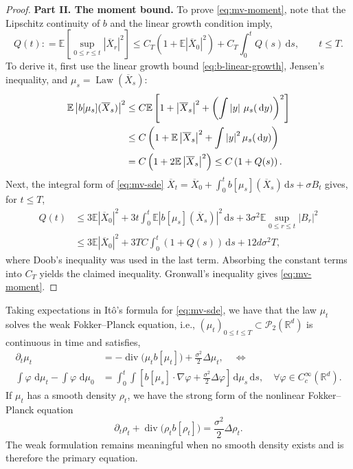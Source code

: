 \documentclass[11pt]{amsart}
\numberwithin{equation}{section}
\theoremstyle{plain}
\newcommand{\R}{\mathbb{R}}
\newcommand{\E}{\mathbb{E}}
\newcommand{\cP}{\mathcal{P}}
\newcommand{\dd}{\,\mathrm{d}}
\newcommand{\abs}[1]{\left\lvert#1\right\rvert}
\DeclareMathOperator{\Law}{Law}
\DeclareMathOperator{\diver}{div}
\begin{document}
\begin{proof}
\textbf{Part II. The moment bound.}
To prove \eqref{eq:mv-moment}, note that the Lipschitz continuity of $b$ and the linear growth condition imply, 
\[
 Q(t): =\E[\sup_{0\leq r\leq t}\abs{\overline X_r}^2] \leq C_T\left(1+\E\abs{\overline X_0}^2\right)
       +C_T\int_0^tQ(s)\dd s,\qquad t\leq T.
\]
To derive it, first use the linear growth bound \eqref{eq:b-linear-growth}, Jensen's inequality, and
$\mu_s=\Law(\overline X_s)$:
\begin{align}
 \E\abs{b[\mu_s](\overline X_s)}^2
 &\leq C\E\left[
 1+\abs{\overline X_s}^2
 +\left(\int\abs{y}\,\mu_s(\dd y)\right)^2\right]\notag\\
 &\leq C\left(1+\E\abs{\overline X_s}^2
 +\int\abs{y}^2\mu_s(\dd y)\right)\notag\\
 &=C\left(1+2\E\abs{\overline X_s}^2\right)
 \leq C\left(1+Q(s)\right).
 \label{eq:mv-drift-moment}
\end{align}
Next, the integral form of \eqref{eq:mv-sde} $ 
\overline X_t=\overline X_0+\int_0^t b[\mu_s](\overline X_s)\dd s+\sigma B_t 
$ gives, for $t\leq T$, 
\begin{align*}
 Q(t)
 &\leq 3\E\abs{\overline X_0}^2
 +3t\int_0^t\E\abs{b[\mu_s](\overline X_s)}^2\dd s
 +3\sigma^2\E\sup_{0\leq r\leq t}\abs{B_r}^2\\
 &\leq 3\E\abs{\overline X_0}^2
 +3TC\int_0^t(1+Q(s))\dd s+12d\sigma^2T,
\end{align*}
where Doob's inequality was used in the last term.  Absorbing the constant
terms into $C_T$ yields the claimed inequality. Gronwall's inequality gives \eqref{eq:mv-moment}.
\end{proof}

Taking expectations in It\^o's formula for \eqref{eq:mv-sde}, we have that the law $\mu_t$ solves the weak Fokker--Planck equation, i.e., $(\mu_t)_{0\leq t\leq T}\subset\cP_2(\R^d)$ is continuous in time and satisfies, 
\begin{equation}\label{eq:mv-weak} 
\begin{aligned}
  \partial_t \mu_t & = -\diver\bigl(\mu_t b[\mu_t]\bigr)  + \frac{\sigma^2}{2} \Delta \mu_t, \quad   \Leftrightarrow  \\
   \int\varphi\,\dd\mu_t-\int\varphi\,\dd\mu_0
   & =\int_0^t\int\left[
       b[\mu_s]\cdot\nabla\varphi
       +\frac{\sigma^2}{2}\Delta\varphi\right]\dd\mu_s\dd s, \quad \forall \varphi\in C_c^\infty(\R^d). 
\end{aligned}
\end{equation} 
If $\mu_t$ has a smooth density $\rho_t$,
we have the strong form of the nonlinear Fokker--Planck equation
\begin{equation}\label{eq:mv-fp}
    \partial_t\rho_t
    +\diver\bigl(\rho_t b[\rho_t]\bigr)
    =\frac{\sigma^2}{2}\Delta\rho_t.
\end{equation}
The weak formulation remains meaningful when no smooth density exists and is
therefore the primary equation.
\end{document}
